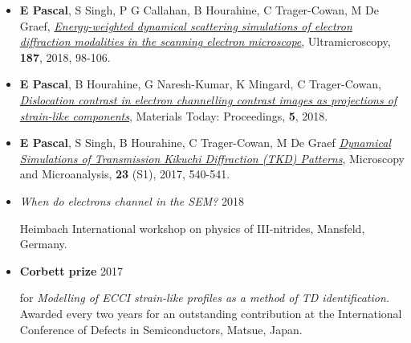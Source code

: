 \documentclass[
11pt, %
oneside, %
english, %
onehalfspacing, %
nolistspacing, %
liststotoc, %
headsepline, %
chapterinoneline, %
]{MastersDoctoralThesis} %
\begin{document}
\begin{contributions}

\vspace{0.3cm}
\begin{itemize}
    \item \textbf{E Pascal}, S Singh, P  G Callahan, B Hourahine, C Trager-Cowan, M De Graef, \href{https://doi.org/10.1016/j.ultramic.2018.01.003}{\textit{Energy-weighted dynamical scattering simulations of electron diffraction modalities in the scanning electron microscope}}, Ultramicroscopy,  \textbf{187}, 2018, 98-106.

    
    \item \textbf{E Pascal}, B Hourahine, G Naresh-Kumar, K Mingard, C Trager-Cowan, \href{https://doi.org/10.1016/j.matpr.2018.03.057}{\textit{Dislocation contrast in electron channelling contrast images as projections of strain-like components}}, Materials Today: Proceedings, \textbf{5}, 2018.
    
    \item \textbf{E Pascal}, S Singh, B Hourahine, C Trager-Cowan, M De Graef \href{https://www.cambridge.org/core/journals/microscopy-and-microanalysis/article/dynamical-simulations-of-transmission-kikuchi-diffraction-tkd-patterns/1863E684CEDF207910A5BFE58D7DE902/share/e286c71a1d759f81d3417ebf6cb4e78b8d81fcd2}{\textit{Dynamical Simulations of Transmission Kikuchi Diffraction (TKD) Patterns}}, Microscopy and Microanalysis, \textbf{23} (S1), 2017, 540-541.
\end{itemize}



\begin{itemize}
    \item \begin{flushleft}\textit{When do electrons channel in the SEM?}  \hfill{} 2018  \end{flushleft}
    Heimbach International workshop on physics of III-nitrides, Mansfeld, Germany.
\end{itemize}


\begin{itemize}
\item \begin{flushleft}\textbf{ Corbett prize } \hfill{} 2017  \end{flushleft}
for \textit{Modelling of ECCI strain-like profiles as a method of TD identification.}\\
    Awarded every two years for an outstanding contribution at the International Conference of Defects in Semiconductors, Matsue, Japan.


\end{itemize}
\end{contributions}
\end{document}
